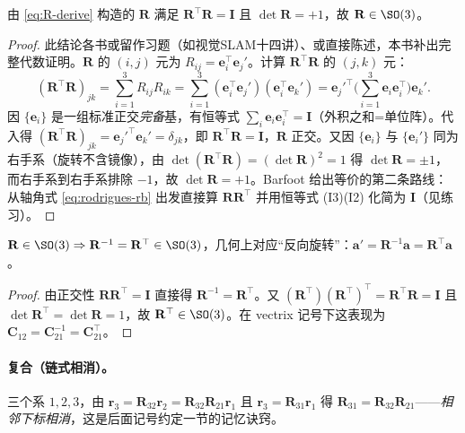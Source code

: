 \begin{theorem}[旋转矩阵的正交性]\label{thm:rb-orthonormal}
由 \cref{eq:R-derive} 构造的 $\mathbf{R}$ 满足 $\mathbf{R}^\top\mathbf{R}=\mathbf{I}$ 且 $\det\mathbf{R}=+1$，故 $\mathbf{R}\in\SO(3)$。
\end{theorem}
\begin{proof}
此结论各书或留作习题（如视觉SLAM十四讲\cite{gaoxiang2019slam14}）、或直接陈述，本书补出完整代数证明。$\mathbf{R}$ 的 $(i,j)$ 元为 $R_{ij}=\mathbf{e}_i^\top\mathbf{e}_j'$。计算 $\mathbf{R}^\top\mathbf{R}$ 的 $(j,k)$ 元：
\[
  (\mathbf{R}^\top\mathbf{R})_{jk}=\sum_{i=1}^3 R_{ij}R_{ik}=\sum_{i=1}^3(\mathbf{e}_i^\top\mathbf{e}_j')(\mathbf{e}_i^\top\mathbf{e}_k')
  =\mathbf{e}_j'^\top\Big(\sum_{i=1}^3\mathbf{e}_i\mathbf{e}_i^\top\Big)\mathbf{e}_k'.
\]
因 $\{\mathbf{e}_i\}$ 是一组标准正交\emph{完备}基，有恒等式 $\sum_i\mathbf{e}_i\mathbf{e}_i^\top=\mathbf{I}$（外积之和=单位阵）。代入得 $(\mathbf{R}^\top\mathbf{R})_{jk}=\mathbf{e}_j'^\top\mathbf{e}_k'=\delta_{jk}$，即 $\mathbf{R}^\top\mathbf{R}=\mathbf{I}$，$\mathbf{R}$ 正交。又因 $\{\mathbf{e}_i\}$ 与 $\{\mathbf{e}_i'\}$ 同为右手系（旋转不含镜像），由 $\det(\mathbf{R}^\top\mathbf{R})=(\det\mathbf{R})^2=1$ 得 $\det\mathbf{R}=\pm1$，而右手系到右手系排除 $-1$，故 $\det\mathbf{R}=+1$。Barfoot 给出等价的第二条路线：从轴角式 \cref{eq:rodrigues-rb} 出发直接算 $\mathbf{R}\mathbf{R}^\top$ 并用恒等式 (I3)(I2) 化简为 $\mathbf{I}$（见练习）。
\end{proof}

\begin{proposition}[旋转矩阵的逆是其转置]\label{prop:R-inv}
$\mathbf{R}\in\SO(3)\Rightarrow\mathbf{R}^{-1}=\mathbf{R}^\top\in\SO(3)$，几何上对应“反向旋转”：$\mathbf{a}'=\mathbf{R}^{-1}\mathbf{a}=\mathbf{R}^\top\mathbf{a}$。
\end{proposition}
\begin{proof}
由正交性 $\mathbf{R}\mathbf{R}^\top=\mathbf{I}$ 直接得 $\mathbf{R}^{-1}=\mathbf{R}^\top$。又 $(\mathbf{R}^\top)(\mathbf{R}^\top)^\top=\mathbf{R}^\top\mathbf{R}=\mathbf{I}$ 且 $\det\mathbf{R}^\top=\det\mathbf{R}=1$，故 $\mathbf{R}^\top\in\SO(3)$。在 vectrix 记号下这表现为 $\mathbf{C}_{12}=\mathbf{C}_{21}^{-1}=\mathbf{C}_{21}^\top$\cite{barfoot2024state}。
\end{proof}

\paragraph{复合（链式相消）。}三个系 $1,2,3$，由 $\mathbf{r}_3=\mathbf{R}_{32}\mathbf{r}_2=\mathbf{R}_{32}\mathbf{R}_{21}\mathbf{r}_1$ 且 $\mathbf{r}_3=\mathbf{R}_{31}\mathbf{r}_1$ 得 $\mathbf{R}_{31}=\mathbf{R}_{32}\mathbf{R}_{21}$——\emph{相邻下标相消}，这是后面记号约定一节的记忆诀窍。

